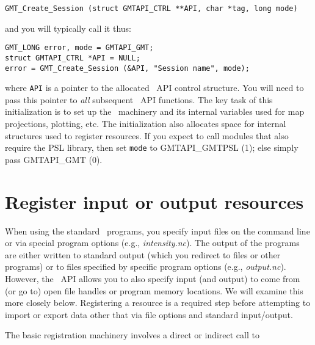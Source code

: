 \documentclass{report}
\begin{document}
\begin{verbatim}
GMT_Create_Session (struct GMTAPI_CTRL **API, char *tag, long mode)
\end{verbatim}
and you will typically call it thus:
\begin{verbatim}
GMT_LONG error, mode = GMTAPI_GMT;
struct GMTAPI_CTRL *API = NULL;
error = GMT_Create_Session (&API, "Session name", mode);
\end{verbatim}
where \texttt{API} is a pointer to the allocated \GMT\ API control structure.  You will need to
pass this pointer to \emph{all} subsequent \GMT\ API functions.  The key task of this initialization
is to set up the \GMT\ machinery and its internal variables used for map projections, plotting,
etc.  The initialization also allocates space for internal structures used to register resources.
If you expect to call modules that also require the PSL library, then set \texttt{mode} to
GMTAPI\_GMTPSL (1); else simply pass GMTAPI\_GMT (0).

\section{Register input or output resources}

When using the standard \GMT\ programs, you specify input files on
the command line or via special program options (e.g., \emph{intensity.nc}). The output of
the programs are either written to standard output (which you redirect to files or other programs)
or to files specified by specific program options (e.g., \emph{output.nc}).  However, the
\GMT\ API allows you to also specify input (and output) to come from (or go to) open file handles
or program memory locations.  We will examine this more closely below.  Registering a
resource is a required step before attempting to import or export data other that via file options
and standard input/output.

The basic registration machinery involves a direct or indirect call to
\end{document}
